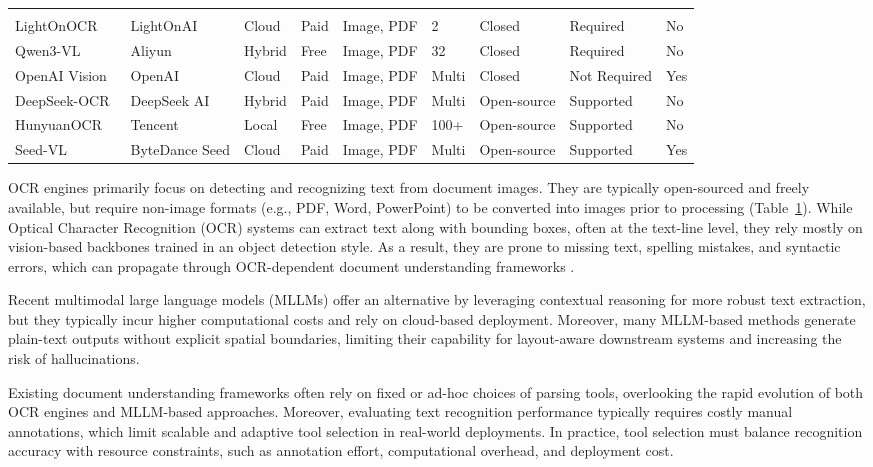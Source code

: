 \documentclass[11pt]{article}
\begin{document}
\begin{table}[ht]
{\begin{tabular}{l l l l l l l l l}
\rowcolor{gray!20}\multicolumn{9}{l}{MLLM} \\
LightOnOCR~\cite{lightonocr2025}& LightOnAI & Cloud & Paid & Image, PDF & 2 & Closed & Required & No \\
Qwen3-VL~\cite{Qwen3-VL} & Aliyun & Hybrid & Free & Image, PDF & 32 & Closed & Required & No \\
OpenAI Vision~\cite{openai_vision_api} & OpenAI & Cloud & Paid & Image, PDF & Multi & Closed & Not Required & Yes \\
DeepSeek-OCR~\cite{wei2025deepseek} & DeepSeek AI & Hybrid & Paid & Image, PDF & Multi & Open-source & Supported & No \\
HunyuanOCR~\cite{hunyuanvisionteam2025hunyuanocrtechnicalreport} & Tencent & Local & Free & Image, PDF & 100+ & Open-source & Supported & No \\
Seed-VL~\cite{seed2025seed1_5vl} & ByteDance Seed & Cloud & Paid & Image, PDF & Multi & Open-source & Supported & Yes \\
\bottomrule
\end{tabular}
}
\label{tab:ocr_llm_comparison}
\end{table}
OCR engines primarily focus on detecting and recognizing text from document images. They are typically open-sourced and freely available, but require non-image formats (e.g., PDF, Word, PowerPoint) to be converted into images prior to processing (Table~\ref{tab:ocr_llm_comparison}). While Optical Character Recognition (OCR) systems can extract text along with bounding boxes, often at the text-line level, they rely mostly on vision-based backbones trained in an object detection style. As a result, they are prone to missing text, spelling mistakes, and syntactic errors, which can propagate through OCR-dependent document understanding frameworks \cite{luo2024layoutllm, ding2025survey}. 

Recent multimodal large language models (MLLMs) offer an alternative by leveraging contextual reasoning for more robust text extraction, but they typically incur higher computational costs and rely on cloud-based deployment. Moreover, many MLLM-based methods generate plain-text outputs without explicit spatial boundaries, limiting their capability for layout-aware downstream systems and increasing the risk of hallucinations. 

Existing document understanding frameworks often rely on fixed or ad-hoc choices of parsing tools, overlooking the rapid evolution of both OCR engines and MLLM-based approaches. Moreover, evaluating text recognition performance typically requires costly manual annotations, which limit scalable and adaptive tool selection in real-world deployments. In practice, tool selection must balance recognition accuracy with resource constraints, such as annotation effort, computational overhead, and deployment cost.
\end{document}

